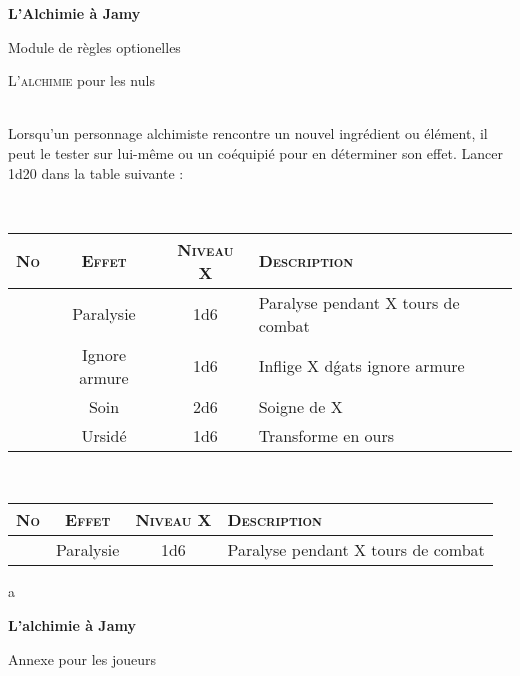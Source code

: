 \documentclass[11pt]{article} %
\newcommand{\enluminure}[2]{\lettrine[lines=3]{\small \initfamily #1}{#2}}
\newcommand{\scbf}[1]{\textsc{\textbf{#1}}}
\newcounter{NoCounter}
\newcommand{\myline}[3]{
    \stepcounter{NoCounter}
    \arabic{NoCounter} & #1 & #2 & #3\\
}
\newcommand{\myjump}[1][1]{\mbox{}\\[#1cm]}
\begin{document}
\pagestyle{empty}

\begin{center}
    \textbf{L'Alchimie à Jamy}

    Module de règles optionelles
\end{center}

\enluminure{L}{'alchimie} pour les nuls


\myjump
Lorsqu'un personnage alchimiste rencontre un nouvel ingrédient ou élément, il peut le tester sur lui-même ou un coéquipié pour en déterminer son effet. Lancer 1d20 dans la table suivante :\newline

\myjump[0]
\begin{tabularx}{\linewidth}{|c|c|c|X|}
\hline
    \setcounter{NoCounter}{0}
    \scbf{No} & \scbf{Effet} & \scbf{Niveau X} & \scbf{Description}\\\hline

    \myline{Paralysie}{1d6}{Paralyse pendant X tours de combat}

    \myline{Ignore armure}{1d6}{Inflige X dǵats ignore armure}

    \myline{Soin}{2d6}{Soigne de X}

    \myline{Ursidé}{1d6}{Transforme en ours}

\hline
\end{tabularx}



\myjump[0.35]
\begin{tabularx}{\linewidth}{|c|c|c|X|}
\hline
    \setcounter{NoCounter}{0}
    \scbf{No} & \scbf{Effet} & \scbf{Niveau X} & \scbf{Description}\\\hline

    \myline{Paralysie}{1d6}{Paralyse pendant X tours de combat}

\hline
\end{tabularx}



\newpage
a



\newpage
{}
\begin{center}
    \textbf{L'alchimie à Jamy}

    Annexe pour les joueurs
\end{center}
\end{document}
